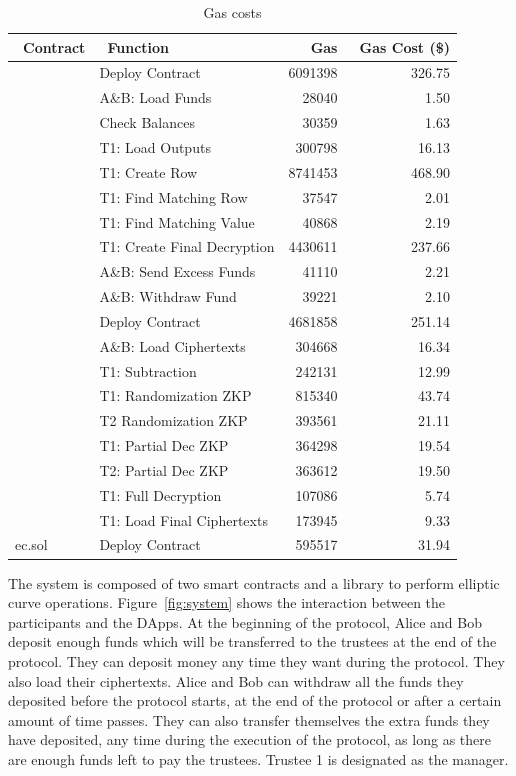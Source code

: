 \begin{table}[]
		\centering
	\begin{tabular}{|l|l|r|r|}
		\hline
		~\textbf{Contract} & ~\textbf{Function } & ~\textbf{Gas}  & ~\textbf{Gas Cost (\$)}  \\ \hline
		\multirow{9}{*}{}  
		& Deploy Contract &6091398 & 326.75 \\ \cline{2-4} 
		& A\&B: Load Funds & 28040  &1.50  \\ \cline{2-4} 
		& Check Balances &  30359& 1.63 \\  \cline{2-4} 
		& T1: Load Outputs&  300798 & 16.13 \\  \cline{2-4} 
		& T1: Create Row & 8741453 & 468.90 \\  \cline{2-4}
		Mixmatch.sol	& T1: Find Matching Row & 37547 &2.01  \\  \cline{2-4}
		& T1: Find Matching Value &  40868&2.19 \\  \cline{2-4}
		& T1:  Create Final Decryption&  4430611& 237.66 \\  \cline{2-4}
		& A\&B: Send Excess Funds &  41110& 2.21 \\  \cline{2-4}
		&  A\&B:  Withdraw Fund&  39221& 2.10 \\   \hline
		\multirow{8}{*}{} 
		& Deploy Contract & 4681858&251.14 \\ \cline{2-4} 
		&   A\&B: Load Ciphertexts & 304668 & 16.34 \\  \cline{2-4}
		& T1: Subtraction & 242131 & 12.99\\  \cline{2-4}
		& T1: Randomization ZKP& 815340 &  43.74\\  \cline{2-4}
		PET.sol	&  T2 Randomization ZKP& 393561 &21.11  \\  \cline{2-4}
		& T1: Partial Dec ZKP& 364298 & 19.54\\  \cline{2-4}
		& T2: Partial Dec ZKP & 363612 & 19.50 \\  \cline{2-4}
		& T1: Full Decryption  &  107086& 5.74 \\  \cline{2-4}
		& T1:  Load Final Ciphertexts& 173945 & 9.33\\ \cline{1-4} 
	ec.sol	& Deploy Contract &595517 & 31.94 \\ \hline
	\end{tabular}
	\caption{Gas costs}
	 \label{tab:gascost}
\end{table}

The system is composed of two smart contracts and a library to perform elliptic curve operations. Figure~\ref{fig:system} shows the interaction between the participants and the DApps. At the beginning of the protocol, Alice and Bob deposit enough funds which will be transferred to the trustees at the end of the protocol. They can deposit money any time they want during the protocol. They also load their ciphertexts. Alice and Bob can withdraw all the funds they deposited before the protocol starts, at the end of the protocol or after a certain amount of time passes. They can also transfer themselves the extra funds they have deposited, any time during the execution of the protocol, as long as there are enough funds left to pay the trustees. Trustee 1 is designated as the manager. 


